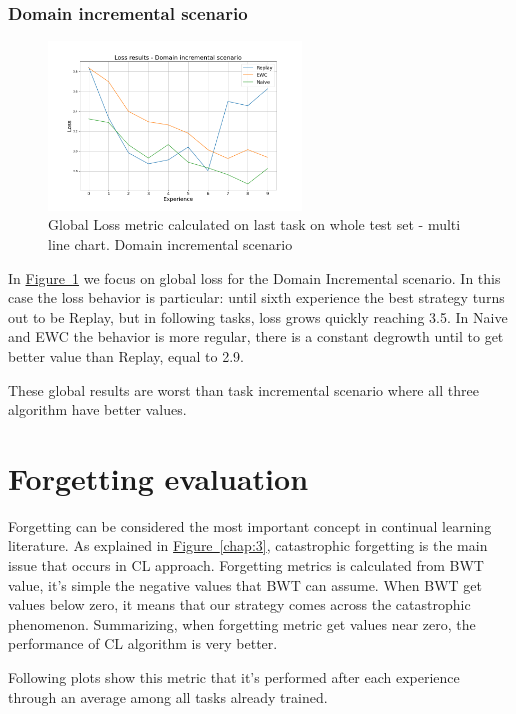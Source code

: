 \documentclass[english, LaM, oneside]{sapthesis}%
\begin{document}
\subsubsection{Domain incremental scenario}

\begin{figure}[h]
  
     \centering
     \includegraphics[width=0.60\textwidth]{overview_loss_ni.png}
     \caption{Global Loss metric calculated on last task on whole test set - multi line chart. Domain incremental scenario}\label{Fig:98}
   
   
\end{figure}
In \hyperref[Fig:98]{Figure~\ref*{Fig:98}} we focus on global loss for the Domain Incremental scenario.
In this case the loss behavior is particular: until sixth experience the best strategy turns out to be Replay, but in following tasks, loss grows quickly reaching 3.5. In Naive and EWC the behavior is more regular, there is a constant degrowth until to get better value than Replay, equal to 2.9. 

These global results are worst than task incremental scenario where all three algorithm have better values. 

\section{Forgetting evaluation}
Forgetting can be considered the most important concept in continual learning literature. As explained in \hyperref[chap:3]{Figure~\ref*{chap:3}}, catastrophic forgetting is the main issue that occurs in CL approach. Forgetting metrics is calculated from BWT value, it's simple the negative values that BWT can assume. When BWT get values below zero, it means that our strategy comes across the catastrophic phenomenon. 
Summarizing, when forgetting metric get values near zero, the performance of CL algorithm is very better.

Following plots show this metric that it's performed after each experience through an average among all tasks already trained.
\end{document}
